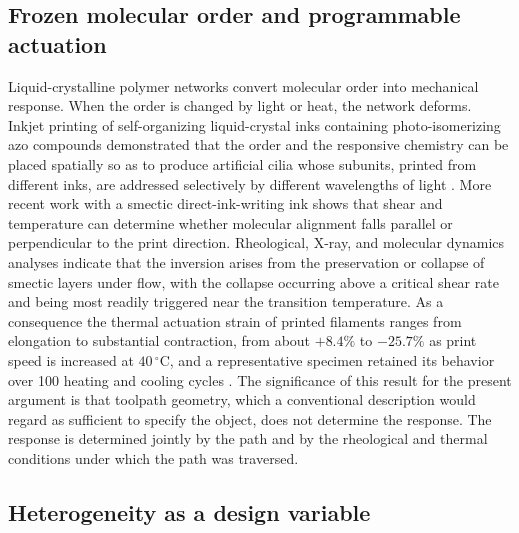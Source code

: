 \documentclass[11pt]{article}
\theoremstyle{definition}
\begin{document}
\subsection{Frozen molecular order and programmable actuation}

Liquid-crystalline polymer networks convert molecular order into mechanical response. When the order is changed by light or heat, the network deforms. Inkjet printing of self-organizing liquid-crystal inks containing photo-isomerizing azo compounds demonstrated that the order and the responsive chemistry can be placed spatially so as to produce artificial cilia whose subunits, printed from different inks, are addressed selectively by different wavelengths of light \cite{vanoosten2009}. More recent work with a smectic direct-ink-writing ink shows that shear and temperature can determine whether molecular alignment falls parallel or perpendicular to the print direction. Rheological, X-ray, and molecular dynamics analyses indicate that the inversion arises from the preservation or collapse of smectic layers under flow, with the collapse occurring above a critical shear rate and being most readily triggered near the transition temperature. As a consequence the thermal actuation strain of printed filaments ranges from elongation to substantial contraction, from about $+8.4\%$ to $-25.7\%$ as print speed is increased at $40\,^{\circ}$C, and a representative specimen retained its behavior over 100 heating and cooling cycles \cite{lee2026}. The significance of this result for the present argument is that toolpath geometry, which a conventional description would regard as sufficient to specify the object, does not determine the response. The response is determined jointly by the path and by the rheological and thermal conditions under which the path was traversed.

\subsection{Heterogeneity as a design variable}
\end{document}
